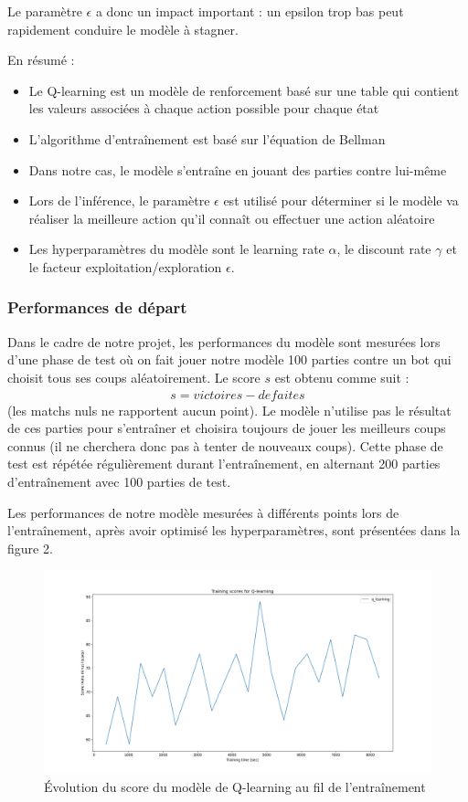 \documentclass[french]{article}
\begin{document}
    Le paramètre $\epsilon$ a donc un impact important : un epsilon trop bas peut rapidement conduire le modèle à stagner.

    En résumé :
    \begin{itemize}
        \item Le Q-learning est un modèle de renforcement basé sur une table qui contient les valeurs associées à chaque action possible pour chaque état
        \item L'algorithme d'entraînement est basé sur l'équation de Bellman
        \item Dans notre cas, le modèle s'entraîne en jouant des parties contre lui-même
        \item Lors de l'inférence, le paramètre $\epsilon$ est utilisé pour déterminer si le modèle va réaliser la meilleure action qu'il connaît ou effectuer une action aléatoire
        \item Les hyperparamètres du modèle sont le learning rate $\alpha$, le discount rate $\gamma$ et le facteur exploitation/exploration $\epsilon$.
    \end{itemize}


    \subsubsection{Performances de départ}

    Dans le cadre de notre projet, les performances du modèle sont mesurées lors d'une phase de test où on fait jouer notre modèle 100 parties contre un bot qui choisit tous ses coups aléatoirement. Le score $s$ est obtenu comme suit : 
    \begin{align*} 
        s = victoires - defaites
    \end{align*} 
    (les matchs nuls ne rapportent aucun point). Le modèle n'utilise pas le résultat de ces parties pour s'entraîner et choisira toujours de jouer les meilleurs coups connus (il ne cherchera donc pas à tenter de nouveaux coups). Cette phase de test est répétée régulièrement durant l'entraînement, en alternant 200 parties d'entraînement avec 100 parties de test.
    
    Les performances de notre modèle mesurées à différents points lors de l'entraînement, après avoir optimisé les hyperparamètres, sont présentées dans la figure 2.

    \begin{figure}[h]
        \includegraphics[width=12cm]{q_learning_metrics}
        \centering
        \caption{Évolution du score du modèle de Q-learning au fil de l'entraînement}
        \centering
    \end{figure}
\end{document}
